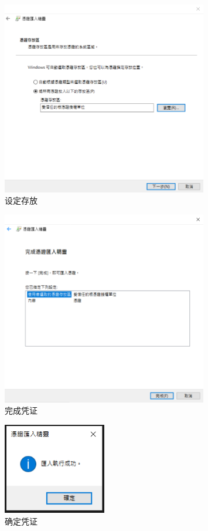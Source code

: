 \begin{figure}[htb]
\centering 
\includegraphics[width=0.80\textwidth]{img/ch1s2m10.png} 
\caption{设定存放}
\label{Test}
\end{figure}

\begin{figure}[htb]
\centering 
\includegraphics[width=0.80\textwidth]{img/ch1s2m11.png} 
\caption{完成凭证}
\label{Test}
\end{figure}

\begin{figure}[htb]
\centering 
\includegraphics[width=0.40\textwidth]{img/ch1s2m12.png} 
\caption{确定凭证}
\label{Test}
\end{figure}

